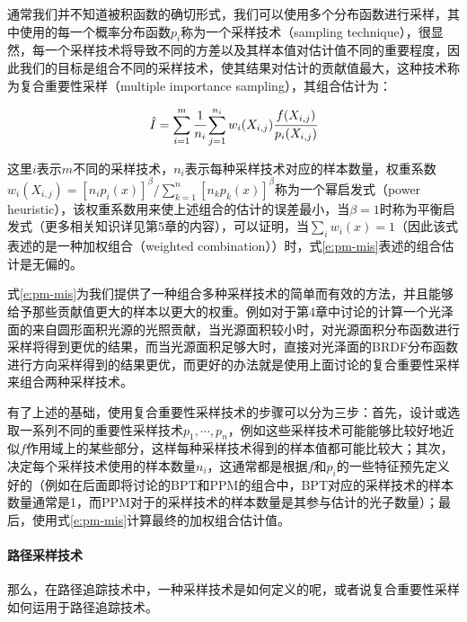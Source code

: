 通常我们并不知道被积函数的确切形式，我们可以使用多个分布函数进行采样，其中使用的每一个概率分布函数$p_i$称为一个采样技术（sampling technique），很显然，每一个采样技术将导致不同的方差以及其样本值对估计值不同的重要程度，因此我们的目标是组合不同的采样技术，使其结果对估计的贡献值最大，这种技术称为复合重要性采样（multiple importance sampling），其组合估计为：

\begin{equation}\label{e:pm-mis}
	\hat{I}=\sum^{m}_{i=1} \cfrac{1}{n_i}\sum^{n_i}_{j=1}w_i(X_{i,j}) \cfrac{f(X_{i,j})}{p_i(X_{i,j})}
\end{equation}

这里$i$表示$m$不同的采样技术，$n_i$表示每种采样技术对应的样本数量，权重系数$w_i(X_{i,j})=[n_ip_i(x)]^{\beta}/\sum^{n}_{k=1}[n_kp_k(x)]^{\beta}$称为一个幂启发式（power heuristic），该权重系数用来使上述组合的估计的误差最小，当$\beta=1$时称为平衡启发式（更多相关知识详见第5章的内容），可以证明，当$\sum_iw_i(x)=1$（因此该式表述的是一种加权组合（weighted combination））时，式\ref{e:pm-mis}表述的组合估计是无偏的。

式\ref{e:pm-mis}为我们提供了一种组合多种采样技术的简单而有效的方法，并且能够给予那些贡献值更大的样本以更大的权重。例如对于第4章中讨论的计算一个光泽面的来自圆形面积光源的光照贡献，当光源面积较小时，对光源面积分布函数进行采样将得到更优的结果，而当光源面积足够大时，直接对光泽面的BRDF分布函数进行方向采样得到的结果更优，而更好的办法就是使用上面讨论的复合重要性采样来组合两种采样技术。

有了上述的基础，使用复合重要性采样技术的步骤可以分为三步：首先，设计或选取一系列不同的重要性采样技术$p_1,\cdots,p_n$，例如这些采样技术可能能够比较好地近似$f$作用域上的某些部分，这样每种采样技术得到的样本值都可能比较大；其次，决定每个采样技术使用的样本数量$n_i$，这通常都是根据$f$和$p_i$的一些特征预先定义好的（例如在后面即将讨论的BPT和PPM的组合中，BPT对应的采样技术的样本数量通常是1，而PPM对于的采样技术的样本数量是其参与估计的光子数量）；最后，使用式\ref{e:pm-mis}计算最终的加权组合估计值。




\paragraph{路径采样技术}
那么，在路径追踪技术中，一种采样技术是如何定义的呢，或者说复合重要性采样如何运用于路径追踪技术。


